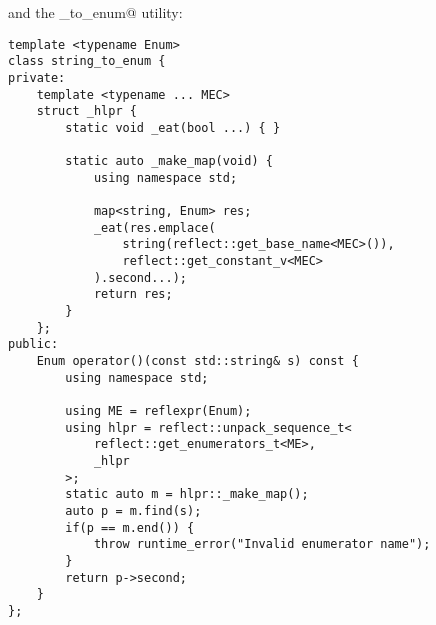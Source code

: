 and the \verb@string_to_enum@ utility:

\begin{verbatim}
template <typename Enum>
class string_to_enum {
private:
	template <typename ... MEC>
	struct _hlpr {
		static void _eat(bool ...) { }

		static auto _make_map(void) {
			using namespace std;

			map<string, Enum> res;
			_eat(res.emplace(
				string(reflect::get_base_name<MEC>()),
				reflect::get_constant_v<MEC>
			).second...);
			return res;
		}
	};
public:
	Enum operator()(const std::string& s) const {
		using namespace std;

		using ME = reflexpr(Enum);
		using hlpr = reflect::unpack_sequence_t<
			reflect::get_enumerators_t<ME>,
			_hlpr
		>;
		static auto m = hlpr::_make_map();
		auto p = m.find(s);
		if(p == m.end()) {
			throw runtime_error("Invalid enumerator name");
		}
		return p->second;
	}
};
\end{verbatim}

